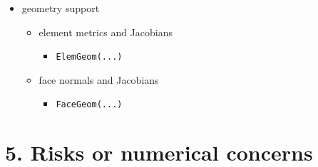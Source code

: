 \documentclass[11pt]{article}
\begin{document}
\begin{itemize}[leftmargin=*]
\begin{itemize}[leftmargin=*]
\begin{itemize}[leftmargin=*]
\end{itemize}
\item $(F, \nabla \phi)_K$
\begin{itemize}[leftmargin=*]
\item \texttt{FluxDriver(...)} plus \texttt{ApplyXx4(...)} in
\texttt{RuElemBlock(...)}
\end{itemize}
\item $\langle \hat{f}, \phi \rangle_{\partial K}$
\begin{itemize}[leftmargin=*]
\item \texttt{FhatDriver(...)} or \texttt{FbouDriver(...)} in
\texttt{RuFaceBlock(...)}
\end{itemize}
\end{itemize}
\item geometry support
\begin{itemize}[leftmargin=*]
\item element metrics and Jacobians
\begin{itemize}[leftmargin=*]
\item \texttt{ElemGeom(...)}
\end{itemize}
\item face normals and Jacobians
\begin{itemize}[leftmargin=*]
\item \texttt{FaceGeom(...)}
\end{itemize}
\end{itemize}
\end{itemize}

\section*{5. Risks or numerical concerns}
\end{document}
